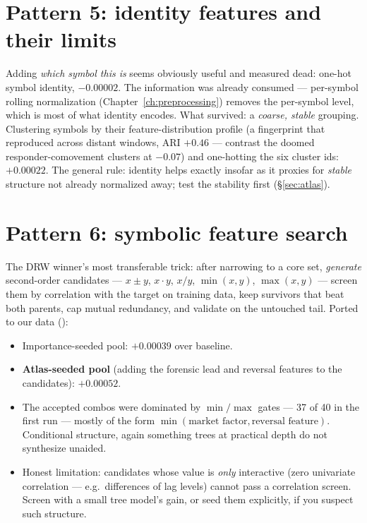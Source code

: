 \section{Pattern 5: identity features and their limits}

Adding \emph{which symbol this is} seems obviously useful and measured
dead: one-hot symbol identity, $-0.00002$. The information was already
consumed --- per-symbol rolling normalization (Chapter~\ref{ch:preprocessing})
removes the per-symbol level, which is most of what identity encodes.
What survived: a \emph{coarse, stable} grouping. Clustering symbols by
their feature-distribution profile (a fingerprint that reproduced across
distant windows, ARI $+0.46$ --- contrast the doomed responder-comovement
clusters at $-0.07$) and one-hotting the six cluster ids: $+0.00022$.
The general rule: identity helps exactly insofar as it proxies for
\emph{stable} structure not already normalized away; test the stability
first (\S\ref{sec:atlas}).

\section{Pattern 6: symbolic feature search}

The DRW winner's most transferable trick: after narrowing to a core set,
\emph{generate} second-order candidates ---
$x\pm y$, $x \cdot y$, $x/y$, $\min(x,y)$, $\max(x,y)$ --- screen them by
correlation with the target on training data, keep survivors that beat
both parents, cap mutual redundancy, and validate on the untouched tail.
Ported to our data ():

\begin{itemize}
\item Importance-seeded pool: $+0.00039$ over baseline.
\item \textbf{Atlas-seeded pool} (adding the forensic lead and reversal
  features to the candidates): $+0.00052$.
\item The accepted combos were dominated by $\min/\max$ gates ---
  37 of 40 in the first run --- mostly of the form
  $\min(\text{market factor}, \text{reversal feature})$. Conditional
  structure, again something trees at practical depth do not synthesize
  unaided.
\item Honest limitation: candidates whose value is \emph{only}
  interactive (zero univariate correlation --- e.g.\ differences of lag
  levels) cannot pass a correlation screen. Screen with a small tree
  model's gain, or seed them explicitly, if you suspect such structure.
\end{itemize}


